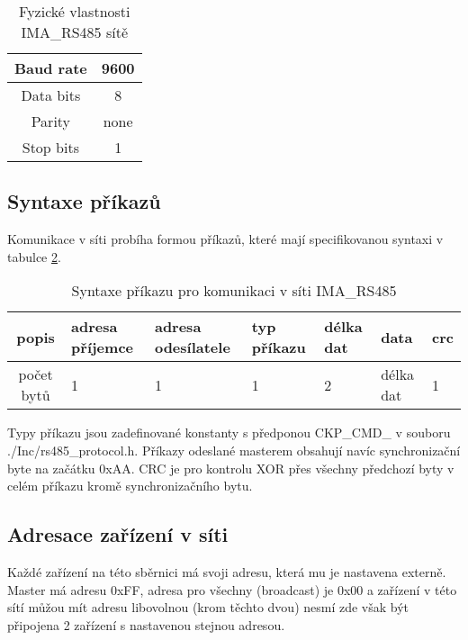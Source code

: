 \begin{table}[!h]
    \centering
    \begin{tabular}{ |c|c| }
     \hline

     Baud rate              & 9600           \\ \hline
     Data bits              & 8                 \\ \hline
     Parity                 & none              \\ \hline
     Stop bits              & 1                 \\ \hline

    \end{tabular}
    \caption{Fyzické vlastnosti IMA\_RS485 sítě}
    \label{table:3}
\end{table}

\newpage
\subsection{Syntaxe příkazů}
Komunikace v síti probíha formou příkazů, které mají specifikovanou syntaxi v tabulce \ref{table:syntaxePrikazu}.

\begin{table}[!h]
    \centering
\begin{tabular}{ |c|| p{1.5cm} | p{1.5cm} | p{1cm} | p{1cm} | p{1cm} | p{1cm} | }
 \hline
 popis      & adresa příjemce & adresa odesílatele & typ příkazu & délka dat & data & crc\\ \hline
 počet bytů & 1               & 1   & 1     & 2     & délka dat     & 1 \\ 
 \hline
\end{tabular}
    \caption{Syntaxe příkazu pro komunikaci v síti IMA\_RS485}
    \label{table:syntaxePrikazu}
\end{table}

Typy příkazu jsou zadefinované konstanty s předponou CKP\_CMD\_ v souboru ./Inc/rs485\_protocol.h.
Příkazy odeslané masterem obsahují navíc synchronizační byte na začátku 0xAA.
CRC je pro kontrolu XOR přes všechny předchozí byty v celém příkazu kromě synchronizačního bytu.

\subsection{Adresace zařízení v síti}
Každé zařízení na této sběrnici má svoji adresu, která mu je nastavena externě. Master má adresu  0xFF, adresa pro všechny (broadcast) je 0x00 a zařízení v této sítí můžou mít adresu libovolnou (krom těchto dvou) nesmí zde však být připojena 2 zařízení s nastavenou stejnou adresou.


